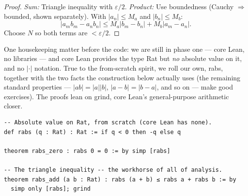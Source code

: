 \documentclass[12pt, openany]{book}
\theoremstyle{plain}
\theoremstyle{definition}
\theoremstyle{remark}
\newcommand{\eps}{\varepsilon}
\newcommand{\li}[1]{{\ttfamily\small\color{tealaccent}#1}}
\begin{document}
\begin{proof}
\textit{Sum:} Triangle inequality with $\eps/2$. \textit{Product:} Use boundedness (Cauchy $\Rightarrow$ bounded, shown separately). With $|a_n| \leq M_a$ and $|b_n| \leq M_b$:
\[ |a_m b_m - a_n b_n| \leq M_a|b_m - b_n| + M_b|a_m - a_n|. \]
Choose $N$ so both terms are $< \eps/2$.
\end{proof}

One housekeeping matter before the code: we are still in phase one --- core Lean, no libraries --- and core Lean provides the type \li{Rat} but \emph{no} absolute value on it, and no $|\cdot|$ notation.  True to the from-scratch spirit, we roll our own, \li{rabs}, together with the two facts the construction below actually uses (the remaining standard properties --- $|ab| = |a||b|$, $|a - b| = |b - a|$, and so on --- make good exercises).  The proofs lean on \li{grind}, core Lean's general-purpose arithmetic closer.

\begin{leanbox}
\begin{lstlisting}
-- Absolute value on Rat, from scratch (core Lean has none).
def rabs (q : Rat) : Rat := if q < 0 then -q else q

theorem rabs_zero : rabs 0 = 0 := by simp [rabs]

-- The triangle inequality -- the workhorse of all of analysis.
theorem rabs_add (a b : Rat) : rabs (a + b) ≤ rabs a + rabs b := by
  simp only [rabs]; grind
\end{lstlisting}
\end{leanbox}
\color{black}
\end{document}

